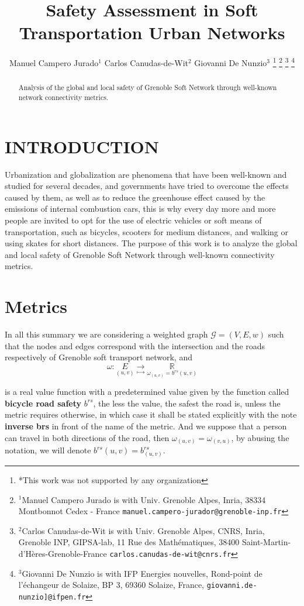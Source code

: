 \documentclass[letterpaper, 10 pt, conference]{ieeeconf}  %
\title{\LARGE \bf
Safety Assessment in Soft Transportation Urban Networks 
}
\author{Manuel Campero Jurado$^{1}$ Carlos Canudas-de-Wit$^{2}$  Giovanni De Nunzio$^{3}$%
\thanks{*This work was not supported by any organization}%
\thanks{$^{1}$Manuel Campero Jurado is with Univ. Grenoble Alpes, Inria, 38334 Montbonnot Cedex - France
        {\tt\small manuel.campero-jurador@grenoble-inp.fr}}%
\thanks{$^{2}$Carlos Canudas-de-Wit is with Univ. Grenoble Alpes, CNRS, Inria, Grenoble INP, GIPSA-lab, 11 Rue des Mathématiques, 
38400 Saint-Martin-d'Hères-Grenoble-France
        {\tt\small carlos.canudas-de-wit@cnrs.fr}}%
\thanks{$^{3}$Giovanni De Nunzio is with IFP Energies nouvelles,
Rond-point de l’échangeur de Solaize, BP 3, 69360 Solaize, France,
        {\tt\small giovanni.de-nunzio]@ifpen.fr}}%
}
\begin{document}
\maketitle
\thispagestyle{empty}
\pagestyle{empty}


\begin{abstract}

Analysis of the global and local safety of Grenoble Soft Network through well-known network connectivity metrics. 

\end{abstract}


\section{INTRODUCTION}
Urbanization and globalization are phenomena that have been well-known and studied for several decades, and governments have tried to overcome the effects caused by them, as well as to reduce the greenhouse effect caused by the emissions of internal combustion cars, this is why every day more and more people are invited to opt for the use of electric vehicles or soft means of transportation, such as bicycles, scooters for medium distances, and walking or using skates for short distances. The purpose of this work is to analyze the global and local safety of Grenoble Soft Network through well-known connectivity metrics. 



\section{Metrics}


   
In all this summary we are considering a weighted graph $\mathcal{G} = (V,E,w)$ such that the nodes and edges correspond with the intersection and the roads respectively of Grenoble soft transport network, and 
\begin{equation}
\omega  \colon \underset{(u,v)}{E} \underset{\mapsto}{\rightarrow} \underset{\omega_{(u,v)} = b^{rs} (u,v)}{ \mathbb{R}}     
\end{equation}

is a real value function with a predetermined value given by the function called \textbf{bicycle road safety} $b^{rs}$, the less the value, the safest the road is, unless the metric requires otherwise, in which case it shall be stated explicitly with the note \textbf{inverse brs} in front of the name of the metric. And we suppose that a person can travel in both directions of the road, then $\omega_{(u,v)} = \omega_{(v,u)}$, by abusing the notation, we will denote $b^{rs} (u,v) = b_{(u,v)}^{rs}$. 
\end{document}

